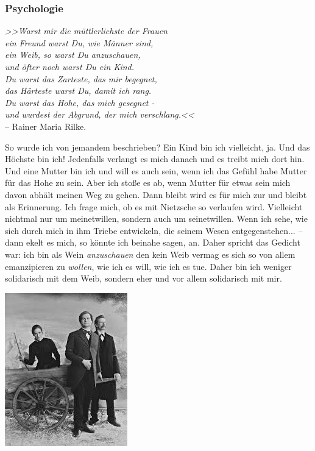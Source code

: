 \documentclass[12pt, a4paper, openany]{report}
\begin{document}
\subsubsection{Psychologie}
\begin{center}
  \textit{
    >>Warst mir die müttlerlichste der Frauen\\
    ein Freund warst Du, wie Männer sind,\\
    ein Weib, so warst Du anzuschauen,\\
    und öfter noch warst Du ein Kind.\\
    Du warst das Zarteste, das mir begegnet,\\
    das Härteste warst Du, damit ich rang.\\
    Du warst das Hohe, das mich gesegnet -\\
    und wurdest der Abgrund, der mich verschlang.<<\\
  }
  \medskip
  -- Rainer Maria Rilke.\\
\end{center}
So wurde ich von jemandem beschrieben? 
Ein Kind bin ich vielleicht, ja.
Und das Höchste bin ich! 
Jedenfalls verlangt es mich danach und es treibt mich dort hin.
Und eine Mutter bin ich und will es auch sein, wenn ich das Gefühl habe Mutter für das Hohe zu sein. 
Aber ich stoße es ab, wenn Mutter für etwas sein mich davon abhält meinen Weg zu gehen. 
Dann bleibt wird es für mich zur und bleibt als Erinnerung. 
Ich frage mich, ob es mit Nietzsche so verlaufen wird. 
Vielleicht nichtmal nur um meinetwillen, sondern auch um seinetwillen. 
Wenn ich sehe, wie sich durch mich in ihm Triebe entwickeln, die seinem Wesen entgegenstehen... -- dann ekelt es mich, so könnte ich beinahe sagen, an.
Daher spricht das Gedicht war:
ich bin als Wein \emph{anzuschauen} den kein Weib vermag es sich so von allem emanzipieren zu \emph{wollen}, wie ich es will, wie ich es tue.
Daher bin ich weniger solidarisch mit dem Weib, sondern eher und vor allem solidarisch mit mir.
\bigskip
\begin{center}
  \includegraphics[scale=0.7]{lou.jpeg}
\end{center}
\end{document}
